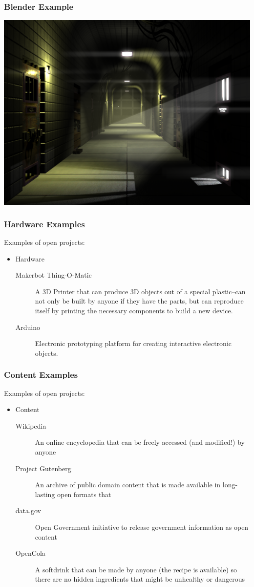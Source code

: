 \documentclass{beamer}
\begin{document}
\begin{frame}
  \frametitle{Blender Example}
    \includegraphics[width=\textwidth]{img/blendermine}
\end{frame}

\begin{frame}
  \frametitle{Hardware Examples}
  Examples of open projects:

  \begin{itemize}
  \item Hardware
    \begin{description}
    \item[Makerbot Thing-O-Matic] A \textcolor{beamer@myblue}{3D}
      Printer that can produce 3D objects out of a special
      plastic--can not only be built by anyone if they have the parts,
      but can \textcolor{beamer@myblue}{reproduce} itself by printing
      the necessary components to build a new device.
    \item[Arduino] Electronic prototyping platform for creating interactive electronic objects.
    \end{description}
  \end{itemize}
\end{frame}

\begin{frame}
  \frametitle{Content Examples}
  Examples of open projects:
  \begin{itemize}
  \item Content
    \begin{description}
    \item[Wikipedia] An online encyclopedia that can be freely accessed (and modified!) by anyone
    \item[Project Gutenberg] An archive of public domain content that is made available in long-lasting open formats that
    \item[data.gov] Open Government initiative to release government information as open content
    \item[OpenCola] A softdrink that can be made by anyone (the recipe
      is available) so there are no hidden ingredients that might be
      unhealthy or dangerous
    \end{description}
  \end{itemize}
\end{frame}
\end{document}
